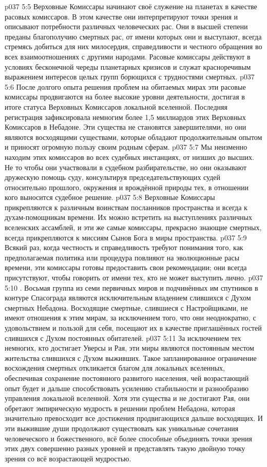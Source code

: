 \vs p037 5:5 Верховные Комиссары начинают своё служение на планетах в качестве расовых комиссаров. В этом качестве они интерпретируют точки зрения и описывают потребности различных человеческих рас. Они в высшей степени преданы благополучию смертных рас, от имени которых они и выступают, всегда стремясь добиться для них милосердия, справедливости и честного обращения во всех взаимоотношениях с другими народами. Расовые комиссары действуют в условиях бесконечной череды планетарных кризисов и служат красноречивым выражением интересов целых групп борющихся с трудностями смертных.
\vs p037 5:6 После долгого опыта решения проблем на обитаемых мирах эти расовые комиссары продвигаются на более высокие уровни деятельности, достигая в итоге статуса Верховных Комиссаров локальной вселенной. Последняя регистрация зафиксировала немногим более 1,5 миллиардов этих Верховных Комиссаров в Небадоне. Эти существа не становятся завершителями, но они являются восходящими существами, которые обладают продолжительным опытом и приносят огромную пользу своим родным сферам.
\vs p037 5:7 Мы неизменно находим этих комиссаров во всех судебных инстанциях, от низших до высших. Не то чтобы они участвовали в судебном разбирательстве, но они оказывают дружескую помощь суду, консультируя председательствующих судей относительно прошлого, окружения и врождённой природы тех, в отношении кого выносится судебное решение.
\vs p037 5:8 Верховные Комиссары прикрепляются к различным воинствам посланников пространства и всегда к духам\hyp{}помощникам времени. Их можно встретить на выступлениях различных вселенских ассамблей, и эти же самые комиссары, прекрасно знающие смертных, всегда прикрепляются к миссиям Сынов Бога в миры пространства.
\vs p037 5:9 Всякий раз, когда честность и справедливость требуют понимания того, как предполагаемая политика или процедура повлияют на эволюционные расы времени, эти комиссары готовы предоставить свои рекомендации; они всегда присутствуют, чтобы говорить от имени тех, кто не может выступить лично.
\vs p037 5:10 \pc {}. Восьмая группа из семи первичных миров и подчинённых им спутников в контуре Спасограда являются исключительным владением слившихся с Духом смертных Небадона. Восходящие смертные, слившиеся с Настройщиками, не имеют отношения к этим мирам, за исключением того, что они неоднократно, с удовольствием и пользой для себя, посещают их в качестве приглашённых гостей слившихся с Духом постоянных обитателей.
\vs p037 5:11 За исключением тех немногих, кто достигает Уверсы и Рая, эти миры являются постоянным местом жительства слившихся с Духом выживших. Такое запланированное ограничение восхождения смертных откликается благом для локальных вселенных, обеспечивая сохранение постоянного развитого населения, чей возрастающий опыт будет и дальше способствовать усилению стабильности и разнообразию управления локальной вселенной. Хотя эти существа и не достигают Рая, они обретают эмпирическую мудрость в решении проблем Небадона, которая значительно превосходит все достижения продвигающихся дальше восходящих. И эти выжившие души продолжают существовать как уникальные сочетания человеческого и божественного, всё более способные объединять точки зрения этих двух совершенно разных уровней и представлять такую двойную точку зрения со всё возрастающей мудростью.
